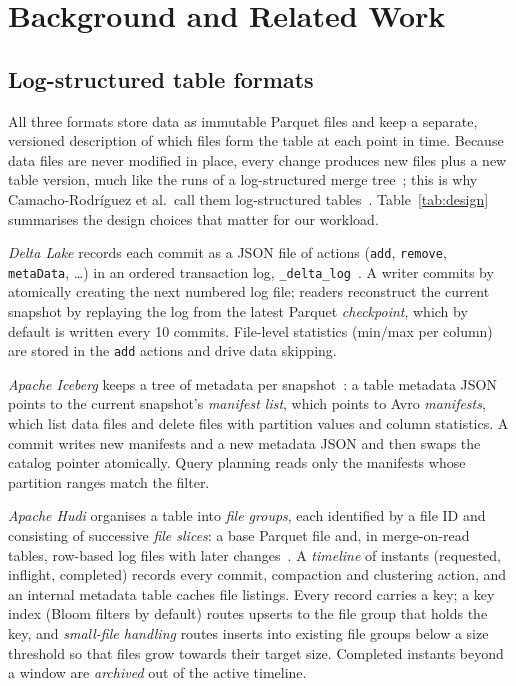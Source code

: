 \documentclass[conference]{IEEEtran}
\begin{document}
\section{Background and Related Work}\label{sec:bg}
\subsection{Log-structured table formats}
All three formats store data as immutable Parquet files and keep a separate, versioned description of which files
form the table at each point in time. Because data files are never modified in place, every change produces new files
plus a new table version, much like the runs of a log-structured merge tree~\cite{oneil1996lsm}; this is why
Camacho-Rodr\'iguez et al.\ call them log-structured tables~\cite{camacho2024lstbench}. Table~\ref{tab:design}
summarises the design choices that matter for our workload.

\emph{Delta Lake} records each commit as a JSON file of actions (\texttt{add}, \texttt{remove}, \texttt{metaData},
\dots) in an ordered transaction log, \texttt{\_delta\_log}~\cite{armbrust2020delta}. A writer commits by atomically
creating the next numbered log file; readers reconstruct the current snapshot by replaying the log from the latest
Parquet \emph{checkpoint}, which by default is written every 10 commits. File-level statistics (min/max per column)
are stored in the \texttt{add} actions and drive data skipping.

\emph{Apache Iceberg} keeps a tree of metadata per snapshot~\cite{iceberg-spec}: a table metadata JSON points to the
current snapshot's \emph{manifest list}, which points to Avro \emph{manifests}, which list data files and delete files
with partition values and column statistics. A commit writes new manifests and a new metadata JSON and then swaps the
catalog pointer atomically. Query planning reads only the manifests whose partition ranges match the filter.

\emph{Apache Hudi} organises a table into \emph{file groups}, each identified by a file ID and consisting of
successive \emph{file slices}: a base Parquet file and, in merge-on-read tables, row-based log files with later
changes~\cite{hudi-docs}. A \emph{timeline} of instants (requested, inflight, completed) records every commit,
compaction and clustering action, and an internal metadata table caches file listings. Every record carries a key; a
key index (Bloom filters by default) routes upserts to the file group that holds the key, and \emph{small-file
handling} routes inserts into existing file groups below a size threshold so that files grow towards their target size.
Completed instants beyond a window are \emph{archived} out of the active timeline.
\end{document}
